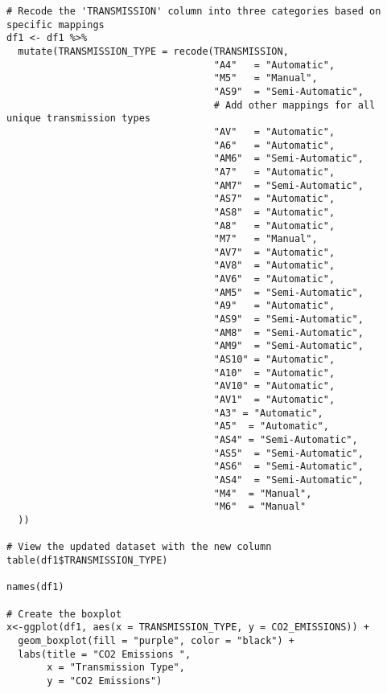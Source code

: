 \documentclass[12pt, a4paper,oneside]{book}
\numberwithin{equation}{section}
\begin{document}
\begin{lstlisting}
# Recode the 'TRANSMISSION' column into three categories based on specific mappings
df1 <- df1 %>%
  mutate(TRANSMISSION_TYPE = recode(TRANSMISSION,
                                    "A4"   = "Automatic",
                                    "M5"   = "Manual",
                                    "AS9"  = "Semi-Automatic",
                                    # Add other mappings for all unique transmission types
                                    "AV"   = "Automatic",
                                    "A6"   = "Automatic",
                                    "AM6"  = "Semi-Automatic",
                                    "A7"   = "Automatic",
                                    "AM7"  = "Semi-Automatic",
                                    "AS7"  = "Automatic",
                                    "AS8"  = "Automatic",
                                    "A8"   = "Automatic",
                                    "M7"   = "Manual",
                                    "AV7"  = "Automatic",
                                    "AV8"  = "Automatic",
                                    "AV6"  = "Automatic",
                                    "AM5"  = "Semi-Automatic",
                                    "A9"   = "Automatic",
                                    "AS9"  = "Semi-Automatic",
                                    "AM8"  = "Semi-Automatic",
                                    "AM9"  = "Semi-Automatic",
                                    "AS10" = "Automatic",
                                    "A10"  = "Automatic",
                                    "AV10" = "Automatic",
                                    "AV1"  = "Automatic",
                                    "A3" = "Automatic",
                                    "A5"  = "Automatic",
                                    "AS4" = "Semi-Automatic",
                                    "AS5"  = "Semi-Automatic",
                                    "AS6"  = "Semi-Automatic",
                                    "AS4"  = "Semi-Automatic",
                                    "M4"  = "Manual",
                                    "M6"  = "Manual"
  ))

# View the updated dataset with the new column
table(df1$TRANSMISSION_TYPE)

names(df1)

# Create the boxplot
x<-ggplot(df1, aes(x = TRANSMISSION_TYPE, y = CO2_EMISSIONS)) +
  geom_boxplot(fill = "purple", color = "black") +
  labs(title = "CO2 Emissions ",
       x = "Transmission Type",
       y = "CO2 Emissions")


\end{lstlisting}
\end{document}
